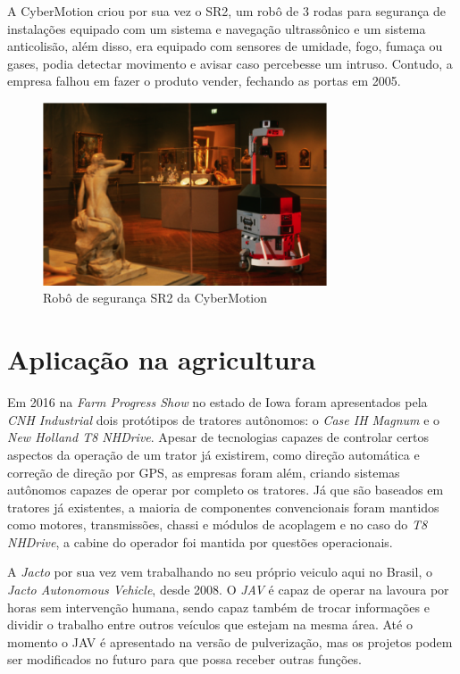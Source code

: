A CyberMotion criou por sua vez o SR2, um robô de 3 rodas para segurança de instalações equipado com um sistema e navegação ultrassônico e um sistema anticolisão, além disso, era equipado com sensores de umidade, fogo, fumaça ou gases, podia detectar movimento e avisar caso percebesse um intruso. Contudo, a empresa falhou em fazer o produto vender, fechando as portas em 2005\cite{bracht:2015}.
\begin{figure}[H]
    \centering
    \includegraphics[width=0.75\textwidth]{figuras/cybermotion SR2.png}
    \caption{Robô de segurança SR2 da CyberMotion}
    \label{fig:cybermotion:sr2}
\end{figure}


\section{Aplicação na agricultura}
Em 2016 na \textit{Farm Progress Show} no estado de Iowa foram apresentados pela \textit{CNH Industrial} dois protótipos de tratores autônomos: o \textit{Case IH Magnum} e o \textit{New Holland T8 NHDrive}. Apesar de tecnologias capazes de controlar certos aspectos da operação de um trator já existirem, como direção automática e correção de direção por GPS, as empresas foram além, criando sistemas autônomos capazes de operar por completo os tratores. Já que são baseados em tratores já existentes, a maioria de componentes convencionais foram mantidos como motores, transmissões, chassi e módulos de acoplagem e no caso do \textit{T8 NHDrive}, a cabine do operador foi mantida por questões operacionais.\cite{engineer:2016}

A \textit{Jacto} por sua vez vem trabalhando no seu próprio veiculo aqui no Brasil, o \textit{Jacto Autonomous Vehicle}, desde 2008. O \textit{JAV} é capaz de operar na lavoura por horas sem intervenção humana, sendo capaz também de trocar informações e dividir o trabalho entre outros veículos que estejam na mesma área.\cite{jacto:2018} Até o momento o JAV é apresentado na versão de pulverização, mas os projetos podem ser modificados no futuro para que possa receber outras funções.

